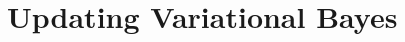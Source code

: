 \documentclass[12pt,a4paper]{article}\usepackage[]{graphicx}\usepackage[]{color}
\begin{document}
\begin{comment}
Online SVB does not provide an approximate distribution at each of a sequence of time points $T_1, T_2, \ldots$, but allows for SVB inference to be substantially sped up by calculating the likelihood of only a subset of the entire dataset each iteration (\cite{Hoffman2013}, \cite{Titsias2014}).
\\

If the data $y_{1:T}$ is conditionally independent given $\theta$, the log-likelihood decomposes into the sum
\begin{equation}
\label{OnlineSVB:likelihood}
\log(p(y_{1:T} | \theta)) = \sum_{t=1}^T \log(p(y_t | \theta)).
\end{equation}

By subsetting $y_{1:T}$ into length $N$ `minibatches', where $N < T$, Online SVB replaces the log-likelihood in the gradient estimates with an unbiased estimator
\begin{equation}
\label{OnlineSVB:likelihoodEstim}
\widehat{\log(p(y_{1:T} | \theta))} = \frac{T}{N} \sum_{t=1}^N \log(p(y_t | \theta))
\end{equation}
where the sum in (\ref{OnlineSVB:likelihoodEstim}) is only over components of $y_{1:T}$ that are in the current minibatch. As this is unbiased, the gradients $\widehat{\partial\mathcal{L}(q, \lambda) / \partial \lambda}$ retain their unbiased properties.
\\

Each iteration of the gradient ascent algorithm should use a different subset of the data, so that sequential iterations cycle through the entire dataset. 
\\
\end{comment}
\section{Updating Variational Bayes}
\label{sec:UVB}
\end{document}
